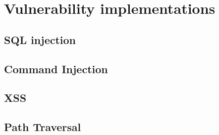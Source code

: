 \chapter{Vulnerability implementations}
\section{SQL injection}\label{appendix:sqli}


\section{Command Injection}\label{appendix:command_injection}


\section{XSS}\label{appendix:xss}


\section{Path Traversal}\label{appendix:path_traversal}



